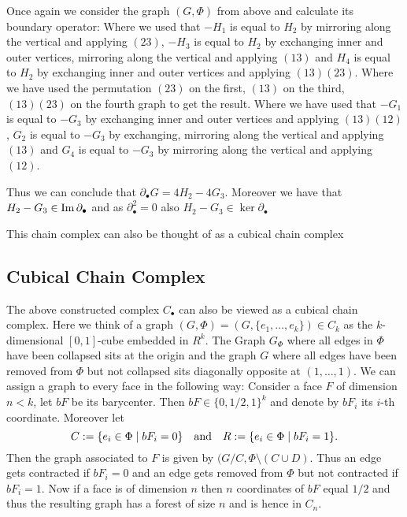 \begin{eg}
	Once again we consider the graph $(G,\Phi)$ from above and calculate its boundary operator:
	Where we used that $-H_{1}$ is equal to $H_{2}$ by mirroring along the vertical and applying $(2 3)$,
	$-H_{3}$ is equal to $H_2$ by exchanging inner and outer vertices, mirroring along the vertical and applying $(1 3)$ and
	$H_{4}$ is equal to $H_{2}$ by exchanging inner and outer vertices and applying $(1 3)(2 3)$.
	Where we have used the permutation $(2 3)$ on the first,  $(1 3)$ on the third, $(1 3)(2 3)$ on the fourth graph to get the result.
	Where we have used that $-G_{1}$ is equal to $-G_{3}$ by exchanging inner and outer vertices and applying $(1 3)(1 2)$,
	$G_{2}$ is equal to $-G_{3}$ by exchanging, mirroring along the vertical and applying $(1 3)$ and
	$G_{4}$ is equal to $-G_{3}$ by mirroring along the vertical and applying $(1 2)$. 

	Thus we can conclude that $\partial_{\bullet} G = 4 H_2 - 4 G_3$. Moreover we have that $H_2 - G_3 \in \operatorname{Im} \partial_{\bullet}$ and 
	as $\partial_{\bullet}^2=0$ also $H_2 - G_3 \in \ker \partial_{\bullet}$
\end{eg}

This chain complex can also be thought of as a cubical chain complex 

\subsection{Cubical Chain Complex}
The above constructed complex $C_{\bullet}$ can also be viewed as a cubical chain complex.
Here we think of a graph $(G,\Phi) = (G, \{e_1,\ldots,e_{k}\})  \in C_{k}$ as the $k$-dimensional $[0,1]$-cube embedded in $R^{k}$.
The Graph $G_{\Phi}$ where all edges in  $\Phi$ have been collapsed sits at the origin and the graph $G$ where all edges have been removed from  $\Phi$ but not collapsed
sits diagonally opposite at  $(1,\ldots,1)$.
We can assign a graph to every face in the following way:
Consider a face $F$ of dimension $n < k$, let $bF$ be its barycenter. Then $bF \in \{0,1 / 2, 1\}^{k}$ and denote by $bF_{i}$ its $i$-th coordinate.
Moreover let
\[
	C := \{e_{i} \in \Phi \mid bF_{i} = 0\} \qq{and} R := \{e_{i} \in \Phi \mid bF_{i} = 1\}  
.\] 
Then the graph associated to $F$ is given by $(G / C, \Phi \setminus (C \cup D)$.
Thus an edge gets contracted if $bF_{i} = 0$ and an edge gets removed from $\Phi$ but not contracted if $bF_{i} = 1$.
Now if a face is of dimension $n$ then $n$ coordinates of $bF$ equal  $1 / 2$ and thus the resulting graph has a forest of size $n$ and is hence in $C_{n}$.

